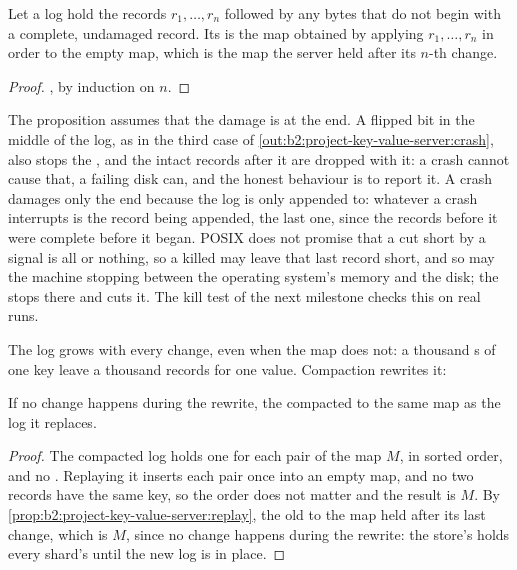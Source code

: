 \begin{proposition}[Replay]\label{prop:b2:project-key-value-server:replay}
Let a log hold the records $r_1, \dots, r_n$ followed by any bytes that do not begin with a complete, undamaged record.
Its  is the map obtained by applying $r_1, \dots, r_n$ in order to the empty map, which is the map the server held
after its $n$-th change.
\end{proposition}

\begin{proof}
, by induction on $n$.
\end{proof}

The proposition assumes that the damage is at the end. A flipped bit in the middle of the log, as in the third case of
\cref{out:b2:project-key-value-server:crash}, also stops the , and the intact records after it are dropped with it:
a crash cannot cause that, a failing disk can, and the honest behaviour is to report it. A crash damages only the end because the log is only appended to: whatever a crash interrupts is
the record being appended, the last one, since the records before it were complete before it began. POSIX does not
promise that a  cut short by a signal is all or nothing, so a killed  may leave that last record
short, and so may the machine stopping between the operating system's memory and the disk; the  stops there and
 cuts it. The kill test of the next milestone checks this on real runs.

The log grows with every change, even when the map does not: a thousand s of one key leave a thousand
records for one value. Compaction rewrites it:

\label{lst:b2:project-key-value-server:compact}

\begin{proposition}[Compaction]\label{prop:b2:project-key-value-server:compaction}
If no change happens during the rewrite, the compacted  to the same map as the log it replaces.
\end{proposition}

\begin{proof}
The compacted log holds one  for each pair of the map $M$, in sorted order, and no . Replaying it
inserts each pair once into an empty map, and no two records have the same key, so the order does not matter and the
result is $M$. By \cref{prop:b2:project-key-value-server:replay}, the old  to the map held after its last
change, which is $M$, since no change happens during the rewrite: the store's  holds every shard's 
until the new log is in place.
\end{proof}

